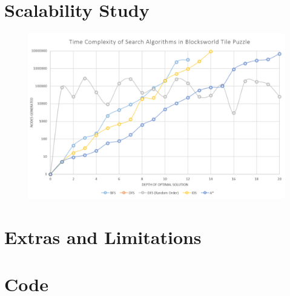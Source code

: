 \documentclass{article}
\begin{document}
	\newpage
	
	\section{Scalability Study}
	\begin{figure}[h]	
		\centering
		\includegraphics[height=0.5\textheight,keepaspectratio]{Results-Plot.png}
	\end{figure}
	
	\section{Extras and Limitations}
	
	\section{Code}
	
\end{document}
